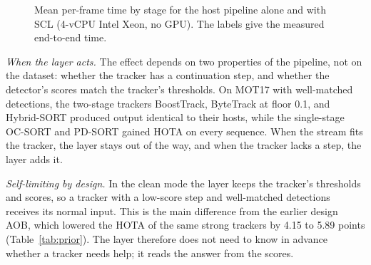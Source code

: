 \documentclass[pdflatex,sn-mathphys-num,iicol]{sn-jnl}
\makeatletter
\def\subsectionfont{\reset@font\fontfamily{\rmdefault}\fontsize{10bp}{12bp}\bfseries\selectfont\raggedright\boldmath}
\renewcommand\subsection{\@startsection{subsection}{2}{\z@}{-7pt \@plus -2pt \@minus -2pt}{3pt}{\subsectionfont}}
\newcommand{\scl}{SCL}
\newcommand{\aob}{AOB}
\makeatother
\begin{document}
\begin{figure}[t]
\centering
{}
\caption{Mean per-frame time by stage for the host pipeline alone and with
\scl{} (4-vCPU Intel Xeon, no GPU). The labels give the measured
end-to-end time.}
\label{fig:runtime}
\end{figure}
\subsection{Analysis}\label{sec:discussion}

\emph{When the layer acts.} The effect depends on two properties of the
pipeline, not on the dataset: whether the tracker has a continuation step,
and whether the detector's scores match the tracker's thresholds. On MOT17
with well-matched detections, the two-stage trackers BoostTrack, ByteTrack at
floor 0.1, and Hybrid-SORT produced output identical to their hosts, while
the single-stage OC-SORT and PD-SORT gained HOTA on every sequence. When the
stream fits the tracker, the layer stays out of the way, and when the
tracker lacks a step, the layer adds it.

\emph{Self-limiting by design.} In the clean mode the layer keeps the
tracker's thresholds and scores, so a tracker with a low-score step and
well-matched detections receives its normal input. This is the main
difference from the earlier design \aob{}, which lowered the HOTA of the same
strong trackers by 4.15 to 5.89 points (Table~\ref{tab:prior}). The layer
therefore does not need to know in advance whether a tracker needs help; it
reads the answer from the scores.
\end{document}
